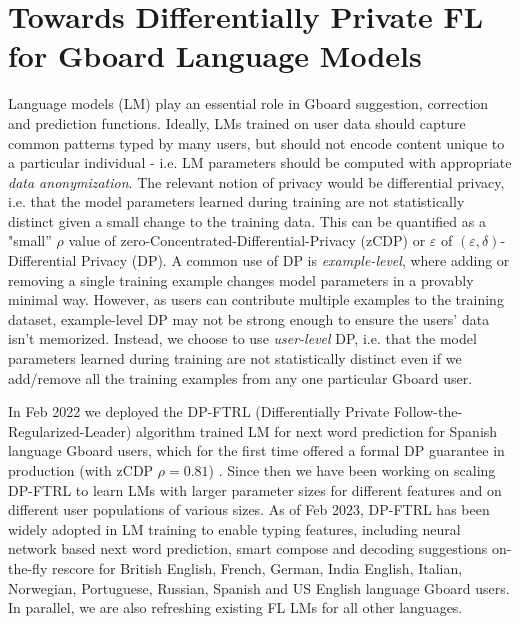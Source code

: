 \documentclass{article}
\begin{document}
\section{Towards Differentially Private FL for Gboard Language Models}

Language models (LM) play an essential role in Gboard suggestion, correction and prediction functions. Ideally, LMs trained on user data should capture common patterns typed by many users, but should not encode content unique to a particular individual - i.e. LM parameters should be computed with appropriate \textit{data anonymization}. The relevant notion of privacy would be differential privacy,  i.e. that the model parameters learned during training are not statistically distinct given a small change to the training data. This can be quantified as a "small” $\rho$ value of zero-Concentrated-Differential-Privacy (zCDP) or $\varepsilon$ of $(\varepsilon, \delta)$-Differential Privacy (DP). A common use of DP is \textit{example-level}, where adding or removing a single training example changes model parameters in a provably minimal way. However, as users can contribute multiple examples to the training dataset, example-level DP may not be strong enough to ensure the users’ data isn't memorized. Instead, we choose to use \textit{user-level} DP, i.e. that the model parameters learned during training are not statistically distinct even if we add/remove all the training examples from any one particular Gboard user.

In Feb 2022 we deployed the DP-FTRL (Differentially Private Follow-the-Regularized-Leader)  algorithm trained LM for next word prediction for Spanish language Gboard users, which for the first time offered a formal DP guarantee in production (with zCDP $\rho=0.81$) \cite{dpftrlblog}. Since then we have been working on scaling DP-FTRL to learn LMs with larger parameter sizes for different features and on different user populations of various sizes. As of Feb 2023, DP-FTRL has been widely adopted in LM training to enable typing features, including neural network based next word prediction, smart compose and decoding suggestions on-the-fly rescore for British English, French, German, India English, Italian, Norwegian, Portuguese, Russian, Spanish and US English language Gboard users. In parallel, we are also refreshing existing FL LMs for all other languages. 
\end{document}
